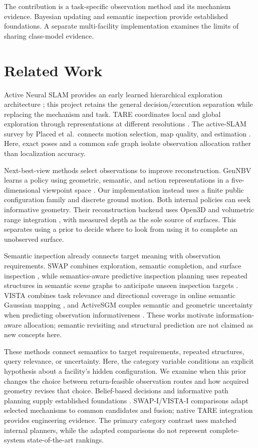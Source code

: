 \documentclass[pdflatex,sn-mathphys-num]{sn-jnl}
\begin{document}
The contribution is a task-specific observation method and its mechanism evidence. Bayesian updating and semantic inspection provide established foundations. A separate multi-facility implementation examines the limits of sharing class-model evidence.

\hypertarget{related-work}{%
\section{Related Work}\label{related-work}}

Active Neural SLAM provides an early learned hierarchical exploration architecture \cite{ref1}; this project retains the general decision/execution separation while replacing the mechanism and task. TARE coordinates local and global exploration through representations at different resolutions \cite{ref5}. The active-SLAM survey by Placed et al.~connects motion selection, map quality, and estimation \cite{ref10}. Here, exact poses and a common safe graph isolate observation allocation rather than localization accuracy.

Next-best-view methods select observations to improve reconstruction. GenNBV learns a policy using geometric, semantic, and action representations in a five-dimensional viewpoint space \cite{ref6}. Our implementation instead uses a finite public configuration family and discrete ground motion. Both internal policies can seek informative geometry. Their reconstruction backend uses Open3D \cite{ref4} and volumetric range integration \cite{ref11}, with measured depth as the sole source of surfaces. This separates using a prior to decide where to look from using it to complete an unobserved surface.

Semantic inspection already connects target meaning with observation requirements. SWAP combines exploration, semantic completion, and surface inspection \cite{ref2}, while semantics-aware predictive inspection planning uses repeated structures in semantic scene graphs to anticipate unseen inspection targets \cite{ref7}. VISTA combines task relevance and directional coverage in online semantic Gaussian mapping \cite{ref3}, and ActiveSGM couples semantic and geometric uncertainty when predicting observation informativeness \cite{ref8}. These works motivate information-aware allocation; semantic revisiting and structural prediction are not claimed as new concepts here.

These methods connect semantics to target requirements, repeated structures, query relevance, or uncertainty. Here, the category variable conditions an explicit hypothesis about a facility's hidden configuration. We examine when this prior changes the choice between return-feasible observation routes and how acquired geometry revises that choice. Belief-based decisions and informative path planning supply established foundations \cite{ref12,ref13}. SWAP-I/VISTA-I comparisons adapt selected mechanisms to common candidates and fusion; native TARE integration provides engineering evidence. The primary category contrast uses matched internal planners, while the adapted comparisons do not represent complete-system state-of-the-art rankings.
\end{document}
